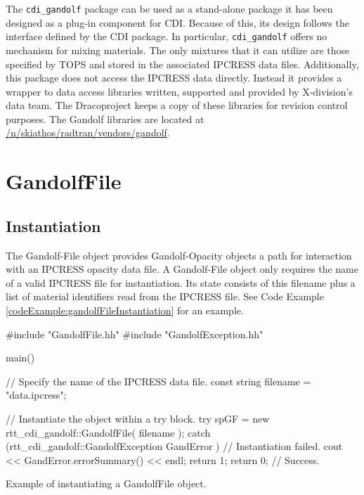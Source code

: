 \documentclass[11pt]{nmemo}
\newcommand{\draco}{{\normalfont\sffamily Draco}}
\newenvironment{codeExample}
{\footnotesize 
  \VerbatimEnvironment
  \begin{SaveVerbatim}{\mycode}}%
  {\end{SaveVerbatim}%
  \noindent%
  \parashade[.950]{sharpcorners}{\gdef\outlineboxwidth{.5}%
    \UseVerbatim{\mycode}}\normalsize}
\begin{document}
The \texttt{cdi\_gandolf} package can be used as a stand-alone package
it has been designed as a plug-in component for CDI.  Because of this,
its design follows the interface defined by the CDI package.  In
particular, \texttt{cdi\_gandolf} offers no mechanism for mixing
materials.  The only mixtures that it can utilize are those specified
by TOPS and stored in the associated IPCRESS data files.
Additionally, this package does not access the IPCRESS data directly.
Instead it provides a wrapper to data access libraries written,
supported and provided by X-division's data team.  The \draco project
keeps a copy of these libraries for revision control purposes.  The
Gandolf libraries are located at
\url{/n/skiathos/radtran/vendors/gandolf}.


\section{GandolfFile}
\label{gandolffile}
\subsection{Instantiation}

The Gandolf-File object provides Gandolf-Opacity objects a path for
interaction with an IPCRESS opacity data file.  A Gandolf-File object
only requires the name of a valid IPCRESS file for instantiation.  Its
state consists of this filename plus a list of material identifiers
read from the IPCRESS file.  See Code Example
\ref{codeExample:gandolfFileInstantiation} for an example.

\begin{cxxSampleCode}
\begin{codeExample}
#include "GandolfFile.hh"
#include "GandolfException.hh"

main()
{
   // Specify the name of the IPCRESS data file.
   const string filename = "data.ipcress";

   // Instantiate the object within a try block.
   try
      {
         spGF = new rtt_cdi_gandolf::GandolfFile( filename );
      }
   catch (rtt_cdi_gandolf::GandolfException GandError )
      {
         // Instantiation failed.
         cout << GandError.errorSummary() << endl;
         return 1;
      }
   return 0;  // Success.
}
\end{codeExample}
\caption{Example of instantiating a GandolfFile object.}
\label{codeExample:gandolfFileInstantiation}
\end{cxxSampleCode}
\end{document}
